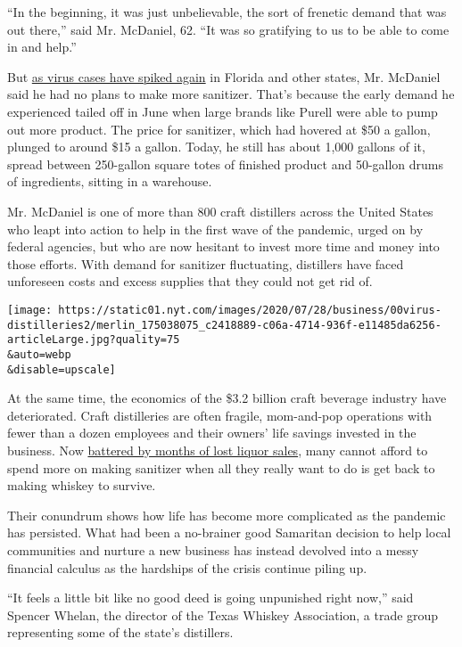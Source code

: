 ``In the beginning, it was just unbelievable, the sort of frenetic
demand that was out there,'' said Mr. McDaniel, 62. ``It was so
gratifying to us to be able to come in and help.''

But
\href{https://www.nytimes.com/interactive/2020/world/coronavirus-maps.html?action=click\&module=Top\%20Stories\&pgtype=Homepage}{as
virus cases have spiked again} in Florida and other states, Mr. McDaniel
said he had no plans to make more sanitizer. That's because the early
demand he experienced tailed off in June when large brands like Purell
were able to pump out more product. The price for sanitizer, which had
hovered at \$50 a gallon, plunged to around \$15 a gallon. Today, he
still has about 1,000 gallons of it, spread between 250-gallon square
totes of finished product and 50-gallon drums of ingredients, sitting in
a warehouse.

Mr. McDaniel is one of more than 800 craft distillers across the United
States who leapt into action to help in the first wave of the pandemic,
urged on by federal agencies, but who are now hesitant to invest more
time and money into those efforts. With demand for sanitizer
fluctuating, distillers have faced unforeseen costs and excess supplies
that they could not get rid of.

\texttt{[image: https://static01.nyt.com/images/2020/07/28/business/00virus-distilleries2/merlin\_175038075\_c2418889-c06a-4714-936f-e11485da6256-articleLarge.jpg?quality=75\\\&auto=webp\\\&disable=upscale]}

At the same time, the economics of the \$3.2 billion craft beverage
industry have deteriorated. Craft distilleries are often fragile,
mom-and-pop operations with fewer than a dozen employees and their
owners' life savings invested in the business. Now
\href{https://www.nytimes.com/2020/04/23/dining/drinks/craft-distillers-coronavirus.html}{battered
by months of lost liquor sales}, many cannot afford to spend more on
making sanitizer when all they really want to do is get back to making
whiskey to survive.

Their conundrum shows how life has become more complicated as the
pandemic has persisted. What had been a no-brainer good Samaritan
decision to help local communities and nurture a new business has
instead devolved into a messy financial calculus as the hardships of the
crisis continue piling up.

``It feels a little bit like no good deed is going unpunished right
now,'' said Spencer Whelan, the director of the Texas Whiskey
Association, a trade group representing some of the state's distillers.

